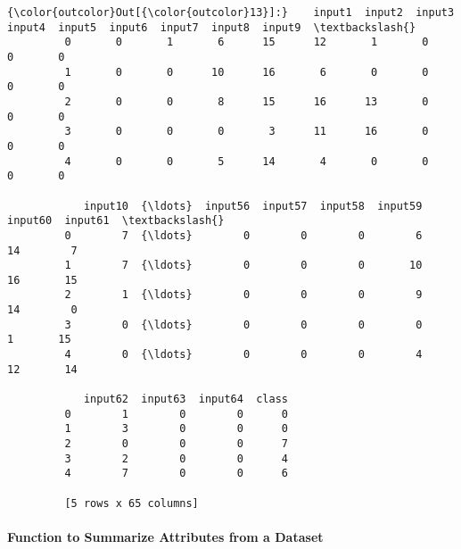 \documentclass[11pt]{article}
\begin{document}
\begin{Verbatim}[commandchars=\\\{\}]
{\color{outcolor}Out[{\color{outcolor}13}]:}    input1  input2  input3  input4  input5  input6  input7  input8  input9  \textbackslash{}
         0       0       1       6      15      12       1       0       0       0   
         1       0       0      10      16       6       0       0       0       0   
         2       0       0       8      15      16      13       0       0       0   
         3       0       0       0       3      11      16       0       0       0   
         4       0       0       5      14       4       0       0       0       0   
         
            input10  {\ldots}  input56  input57  input58  input59  input60  input61  \textbackslash{}
         0        7  {\ldots}        0        0        0        6       14        7   
         1        7  {\ldots}        0        0        0       10       16       15   
         2        1  {\ldots}        0        0        0        9       14        0   
         3        0  {\ldots}        0        0        0        0        1       15   
         4        0  {\ldots}        0        0        0        4       12       14   
         
            input62  input63  input64  class  
         0        1        0        0      0  
         1        3        0        0      0  
         2        0        0        0      7  
         3        2        0        0      4  
         4        7        0        0      6  
         
         [5 rows x 65 columns]
\end{Verbatim}
            
    \hypertarget{function-to-summarize-attributes-from-a-dataset}{%
\paragraph{Function to Summarize Attributes from a
Dataset}\label{function-to-summarize-attributes-from-a-dataset}}
\end{document}
